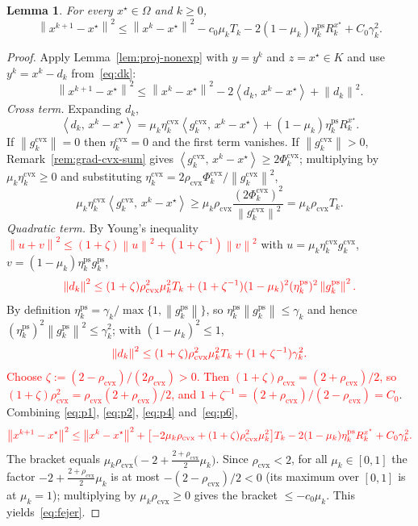 \documentclass[]{interact}
\theoremstyle{plain}
\newtheorem{lemma}[theorem]{Lemma}
\theoremstyle{definition}
\theoremstyle{remark}
\newcommand{\norm}[1]{\left\lVert #1 \right\rVert}
\newcommand{\inner}[2]{\left\langle #1,\, #2 \right\rangle}
\newcommand{\cvx}{\mathrm{cvx}}
\newcommand{\ps}{\mathrm{ps}}
\begin{document}
\begin{lemma}\label{lem:fejer}
For every $x^\star\in\Omega$ and $k\ge 0$,
\begin{equation}\label{eq:fejer}
\norm{x^{k+1}-x^\star}^2\le\norm{x^k-x^\star}^2-c_0\mu_k T_k-2(1-\mu_k)\eta^{\ps}_k R^{x^\star}_k+C_0\gamma_k^2 .
\end{equation}
\end{lemma}
\begin{proof}
Apply Lemma~\ref{lem:proj-nonexp} with $y=y^k$ and $z=x^\star\in K$ and use
$y^k=x^k-d_k$ from~\eqref{eq:dk}:
\begin{equation}\label{eq:p1}
\norm{x^{k+1}-x^\star}^2\le\norm{x^k-x^\star}^2-2\inner{d_k}{x^k-x^\star}+\norm{d_k}^2 .
\end{equation}
\emph{Cross term.} Expanding $d_k$,
\begin{equation}\label{eq:p2}
\inner{d_k}{x^k-x^\star}=\mu_k\eta^{\cvx}_k\inner{g^{\cvx}_k}{x^k-x^\star}+(1-\mu_k)\eta^{\ps}_k R^{x^\star}_k .
\end{equation}
If $\norm{g^{\cvx}_k}=0$ then $\eta^{\cvx}_k=0$ and the first term vanishes. If
$\norm{g^{\cvx}_k}>0$, Remark~\ref{rem:grad-cvx-sum} gives
$\inner{g^{\cvx}_k}{x^k-x^\star}\ge 2\Phi^{\cvx}_k$; multiplying by
$\mu_k\eta^{\cvx}_k\ge 0$ and substituting
$\eta^{\cvx}_k=2\rho_{\cvx}\Phi^{\cvx}_k/\norm{g^{\cvx}_k}^2$,
\begin{equation}\label{eq:p4}
\mu_k\eta^{\cvx}_k\inner{g^{\cvx}_k}{x^k-x^\star}\ge\mu_k\rho_{\cvx}\frac{(2\Phi^{\cvx}_k)^2}{\norm{g^{\cvx}_k}^2}=\mu_k\rho_{\cvx}T_k .
\end{equation}
\emph{Quadratic term.} By Young's inequality
\leavevmode\textcolor{red}{$\norm{u+v}^2\le(1+\zeta)\norm{u}^2+(1+\zeta^{-1})\norm{v}^2$} with
$u=\mu_k\eta^{\cvx}_k g^{\cvx}_k$, $v=(1-\mu_k)\eta^{\ps}_k g^{\ps}_k$,
\[\textcolor{red}{
\norm{d_k}^2\le(1+\zeta)\rho_{\cvx}^2\mu_k^2 T_k+(1+\zeta^{-1})(1-\mu_k)^2(\eta^{\ps}_k)^2\norm{g^{\ps}_k}^2 .
}\]
By definition $\eta^{\ps}_k=\gamma_k/\max\{1,\norm{g^{\ps}_k}\}$, so
$\eta^{\ps}_k\norm{g^{\ps}_k}\le\gamma_k$ and hence
$(\eta^{\ps}_k)^2\norm{g^{\ps}_k}^2\le\gamma_k^2$; with $(1-\mu_k)^2\le 1$,
\begin{equation}\label{eq:p6}\textcolor{red}{
\norm{d_k}^2\le(1+\zeta)\rho_{\cvx}^2\mu_k^2 T_k+(1+\zeta^{-1})\gamma_k^2 .
}\end{equation}
\leavevmode\textcolor{red}{Choose $\zeta:=(2-\rho_{\cvx})/(2\rho_{\cvx})>0$. Then
$(1+\zeta)\rho_{\cvx}=(2+\rho_{\cvx})/2$, so
$(1+\zeta)\rho_{\cvx}^2=\rho_{\cvx}(2+\rho_{\cvx})/2$, and
$1+\zeta^{-1}=(2+\rho_{\cvx})/(2-\rho_{\cvx})=C_0$}. Combining
\eqref{eq:p1}, \eqref{eq:p2}, \eqref{eq:p4} and~\eqref{eq:p6},
\[\textcolor{red}{
\norm{x^{k+1}-x^\star}^2\le\norm{x^k-x^\star}^2+\bigl[-2\mu_k\rho_{\cvx}+(1+\zeta)\rho_{\cvx}^2\mu_k^2\bigr]T_k-2(1-\mu_k)\eta^{\ps}_k R^{x^\star}_k+C_0\gamma_k^2 .
}\]
The bracket equals
$\mu_k\rho_{\cvx}\bigl(-2+\tfrac{2+\rho_{\cvx}}{2}\mu_k\bigr)$. Since $\rho_{\cvx}<2$, for
all $\mu_k\in[0,1]$ the factor $-2+\tfrac{2+\rho_{\cvx}}{2}\mu_k$ is at most
$-(2-\rho_{\cvx})/2<0$ (its maximum over $[0,1]$ is at $\mu_k=1$); multiplying by
$\mu_k\rho_{\cvx}\ge0$ gives the bracket $\le -c_0\mu_k$. This yields~\eqref{eq:fejer}.
\end{proof}
\end{document}
